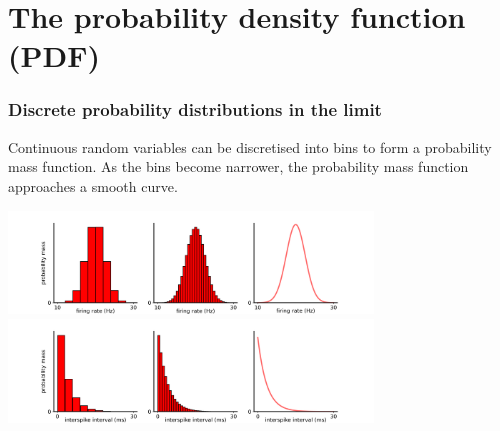 \documentclass{beamer}
\begin{document}
\section{The probability density function (PDF)} %
\begin{frame}
\frametitle{Discrete probability distributions in the limit} %


Continuous random variables can be discretised into bins to form a probability mass function. As the bins become narrower, the probability mass function approaches a smooth curve.


\vspace{-0.25cm}
\center \includegraphics[height=2.75cm]{images/normal_mass_to_hist.png}
\vspace{-0.25cm}
\center \includegraphics[height=2.75cm]{images/exp_mass_to_hist.png}

\end{frame}


\end{document}
